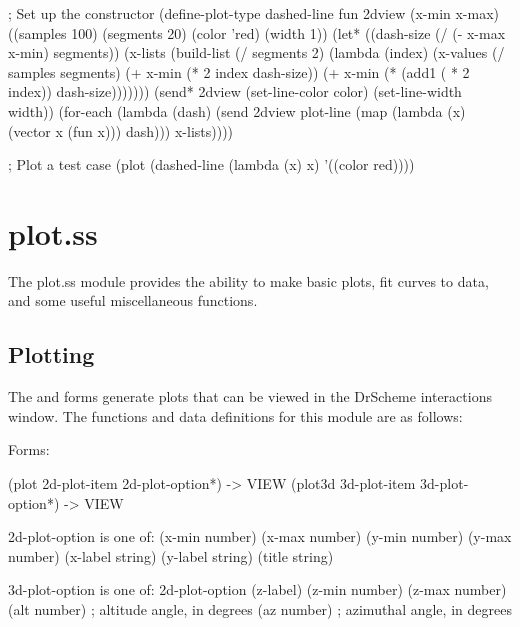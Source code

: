 \documentclass{article}
\begin{document}
{\begin{schemedisplay}
; Set up the constructor
(define-plot-type dashed-line
  fun 2dview (x-min x-max) ((samples 100) (segments 20) (color 'red) (width 1))
  (let* ((dash-size (/ (- x-max x-min) segments))
         (x-lists (build-list 
                   (/ segments 2) 
                   (lambda (index)                                    
                     (x-values 
                      (/ samples segments) 
                      (+ x-min (* 2 index dash-size))
                      (+ x-min (* (add1 ( * 2 index)) dash-size)))))))
    (send* 2dview 
           (set-line-color color)
           (set-line-width width))
    (for-each 
     (lambda (dash)
       (send 2dview plot-line 
              (map (lambda (x) (vector x (fun x))) dash))) 
     x-lists))))

; Plot a test case
(plot (dashed-line (lambda (x) x) '((color red))))
\end{schemedisplay}

\pagebreak

\section{plot.ss}

The plot.ss module provides the ability to make basic plots, fit curves to data, and some useful miscellaneous functions.

\subsection{Plotting}


The  and  forms generate plots that can be viewed in the DrScheme interactions window. The functions and data definitions for this  module are as follows:



\begin{schemedisplay}

       
Forms:
       
 (plot 2d-plot-item 2d-plot-option*) -> VIEW
 (plot3d 3d-plot-item 3d-plot-option*) -> VIEW
     
2d-plot-option is one of:
 (x-min number)
 (x-max number)
 (y-min number)
 (y-max number)
 (x-label string)
 (y-label string)
 (title string)
     
3d-plot-option is one of:
 2d-plot-option
 (z-label)
 (z-min number)
 (z-max number)
 (alt number)    ; altitude angle, in degrees
 (az number)     ; azimuthal angle, in degrees
     

\end{schemedisplay}}
\end{document}
